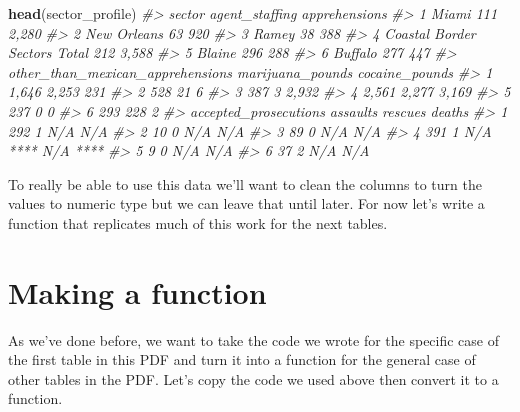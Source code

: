 \documentclass[
  12pt,
]{book}
\newenvironment{Shaded}{\begin{snugshade}}{\end{snugshade}}
\newcommand{\CommentTok}[1]{\textcolor[rgb]{0.37,0.37,0.37}{\textit{#1}}}
\newcommand{\KeywordTok}[1]{\textcolor[rgb]{0.27,0.27,0.27}{\textbf{#1}}}
\newcommand{\NormalTok}[1]{#1}
\begin{document}
\begin{Shaded}
\begin{Highlighting}[]
\KeywordTok{head}\NormalTok{(sector\_profile)}
\CommentTok{\#>                         sector agent\_staffing apprehensions}
\CommentTok{\#> 1                        Miami            111         2,280}
\CommentTok{\#> 2                  New Orleans             63           920}
\CommentTok{\#> 3                        Ramey             38           388}
\CommentTok{\#> 4 Coastal Border Sectors Total            212         3,588}
\CommentTok{\#> 5                       Blaine            296           288}
\CommentTok{\#> 6                      Buffalo            277           447}
\CommentTok{\#>   other\_than\_mexican\_apprehensions marijuana\_pounds cocaine\_pounds}
\CommentTok{\#> 1                            1,646            2,253            231}
\CommentTok{\#> 2                              528               21              6}
\CommentTok{\#> 3                              387                3          2,932}
\CommentTok{\#> 4                            2,561            2,277          3,169}
\CommentTok{\#> 5                              237                0              0}
\CommentTok{\#> 6                              293              228              2}
\CommentTok{\#>   accepted\_prosecutions assaults           rescues deaths}
\CommentTok{\#> 1                   292        1               N/A    N/A}
\CommentTok{\#> 2                    10        0               N/A    N/A}
\CommentTok{\#> 3                    89        0               N/A    N/A}
\CommentTok{\#> 4                   391        1 N/A **** N/A ****       }
\CommentTok{\#> 5                     9        0               N/A    N/A}
\CommentTok{\#> 6                    37        2               N/A    N/A}
\end{Highlighting}
\end{Shaded}

To really be able to use this data we'll want to clean the columns to turn the values to numeric type but we can leave that until later. For now let's write a function that replicates much of this work for the next tables.

\hypertarget{making-a-function}{%
\section{Making a function}\label{making-a-function}}

As we've done before, we want to take the code we wrote for the specific case of the first table in this PDF and turn it into a function for the general case of other tables in the PDF. Let's copy the code we used above then convert it to a function.
\end{document}
